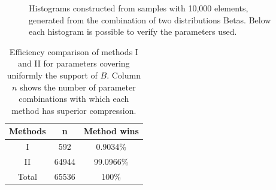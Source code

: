\documentclass[10pt]{article}
\begin{document}
\begin{figure}[h]
{  }
  \caption{Histograms constructed from samples with 10,000 elements, generated from the combination of two distributions Betas. Below each histogram is possible to verify the parameters used.}
  \label{fig:02B}
\end{figure}

\begin{table}[h]
 \centering
 \caption{Efficiency comparison of methods I and II for parameters covering uniformly the support of $B$. Column $n$ shows the number of parameter combinations with which each method has superior compression.}
 \begin{tabular}{ccc}
  \hline 
  Methods  & n   & Method wins \\
  \hline
  I	   & 592	& 0.9034\% \\
  II	   & 64944	& 99.0966\% \\
  \hline
  Total    & 65536	& 100\% \\
  \hline
 \end{tabular}
 \label{tab:06}
\end{table}
\end{document}
